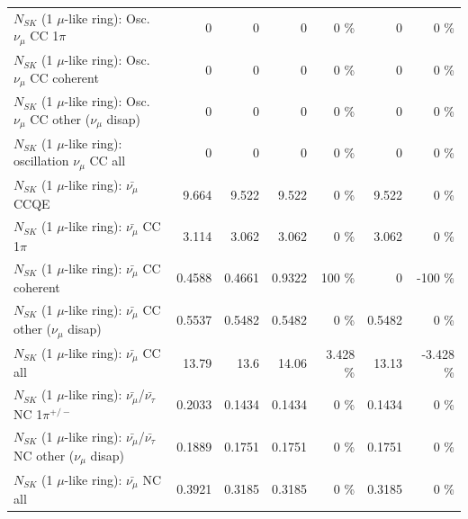 \begin{table}
\begin{tabular}{| l | r | r | r  r | r  r |}
                          $N_{SK}$ (1 $\mu$-like ring): Osc. $\nu_\mu$ CC 1$\pi$ &               0 &               0 &               0 &        0 \%  &               0 &        0 \%  \\ 
                        $N_{SK}$ (1 $\mu$-like ring): Osc. $\nu_\mu$ CC coherent &               0 &               0 &               0 &        0 \%  &               0 &        0 \%  \\ 
         $N_{SK}$ (1 $\mu$-like ring): Osc. $\nu_\mu$ CC other ($\nu_\mu$ disap) &               0 &               0 &               0 &        0 \%  &               0 &        0 \%  \\ 
                      $N_{SK}$ (1 $\mu$-like ring): oscillation $\nu_\mu$ CC all &               0 &               0 &               0 &        0 \%  &               0 &        0 \%  \\ 
\hline
\hline
                              $N_{SK}$ (1 $\mu$-like ring): $\bar{\nu_\mu}$ CCQE &           9.664 &           9.522 &           9.522 &        0 \%  &           9.522 &        0 \%  \\ 
                         $N_{SK}$ (1 $\mu$-like ring): $\bar{\nu_\mu}$ CC 1$\pi$ &           3.114 &           3.062 &           3.062 &        0 \%  &           3.062 &        0 \%  \\ 
                       $N_{SK}$ (1 $\mu$-like ring): $\bar{\nu_\mu}$ CC coherent &          0.4588 &          0.4661 &          0.9322 &      100 \%  &               0 &     -100 \%  \\ 
        $N_{SK}$ (1 $\mu$-like ring): $\bar{\nu_\mu}$ CC other ($\nu_\mu$ disap) &          0.5537 &          0.5482 &          0.5482 &        0 \%  &          0.5482 &        0 \%  \\ 
                          $N_{SK}$ (1 $\mu$-like ring): $\bar{\nu_{\mu}}$ CC all &           13.79 &            13.6 &           14.06 &    3.428 \%  &           13.13 &   -3.428 \%  \\ 
\hline
  $N_{SK}$ (1 $\mu$-like ring): $\bar{\nu_\mu}$/$\bar{\nu_\tau}$ NC 1$\pi^{+/-}$ &          0.2033 &          0.1434 &          0.1434 &        0 \%  &          0.1434 &        0 \%  \\ 
$N_{SK}$ (1 $\mu$-like ring): $\bar{\nu_\mu}$/$\bar{\nu_\tau}$ NC other ($\nu_\mu$ disap) &          0.1889 &          0.1751 &          0.1751 &        0 \%  &          0.1751 &        0 \%  \\ 
                          $N_{SK}$ (1 $\mu$-like ring): $\bar{\nu_{\mu}}$ NC all &          0.3921 &          0.3185 &          0.3185 &        0 \%  &          0.3185 &        0 \%  \\ 

\end{tabular}
\end{table}
